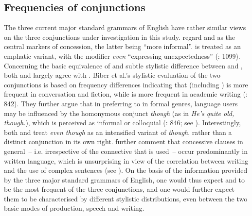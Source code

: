 \subsection{\label{bkm:Ref35511425}\label{bkm:Ref35777602}Frequencies of conjunctions}\label{sec:5.1.1}

The three current major standard grammars of English have rather similar views on the three conjunctions under investigation in this study. \citet[1097–1099]{QuirkEtAl1985} regard  and  as the central markers of concession, the latter being “more informal”.  is treated as an emphatic variant, with the modifier \textit{even} “expressing unexpectedness” (\citealt{QuirkEtAl1985}: 1099). Concerning the basic equivalence of and subtle stylistic difference between  and , both \citet[845]{BiberEtAl1999} and  \citet[736]{HuddlestonPullum2002} largely agree with \citet{QuirkEtAl1985}. Biber et al.’s stylistic evaluation of the two conjunctions is based on frequency differences indicating that  (including ) is more frequent in conversation and fiction, while  is more frequent in academic writing (\citealt{BiberEtAl1999}: 842). They further argue that in preferring  to  in formal genres, language users may be influenced by the homonymous conjunct \textit{though} (as in \textit{He’s quite old, though.}), which is perceived as informal or colloquial (\citeyear{BiberEtAl1999}: 846; see \citealt{Schützler2020a}). Interestingly, both \citet{BiberEtAl1999} and \citet{HuddlestonPullum2002} treat \textit{even though} as an intensified variant of \textit{though}, rather than a distinct conjunction in its own right. \citet[821]{BiberEtAl1999} further comment that concessive clauses in general~– i.e. irrespective of the connective that is used~– occur predominantly in written language, which is unsurprising in view of the correlation between writing and the use of complex sentences (see ). On the basis of the information provided by the three major standard grammars of English, one would thus expect  and  to be the most frequent of the three conjunctions, and one would further expect them to be characterised by different stylistic distributions, even between the two basic modes of production, speech and writing.

